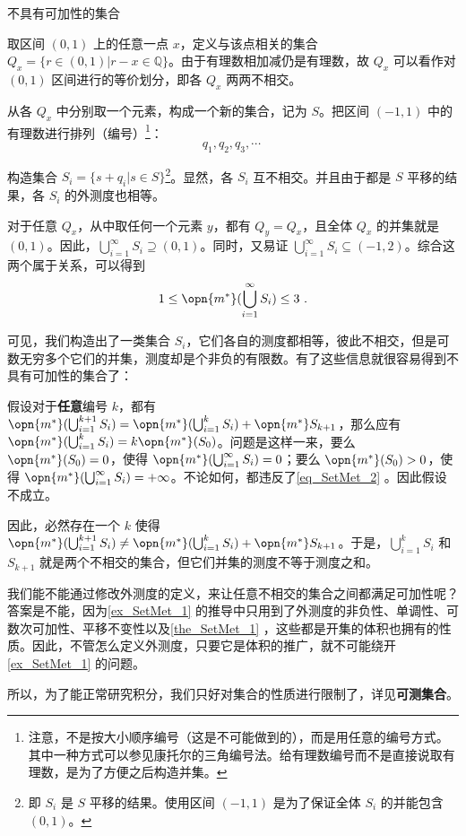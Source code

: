 \begin{example}{不具有可加性的集合}\label{ex_SetMet_1}

取区间 $(0, 1)$ 上的任意一点 $x$，定义与该点相关的集合 $Q_x=\{r\in(0, 1)|r-x\in\mathbb{Q}\}$。由于有理数相加减仍是有理数，故 $Q_x$ 可以看作对 $(0, 1)$ 区间进行的等价划分，即各 $Q_x$ 两两不相交。

从各 $Q_x$ 中分别取一个元素，构成一个新的集合，记为 $S$。把区间 $(-1, 1)$ 中的有理数进行排列（编号）\footnote{注意，不是按大小顺序编号（这是不可能做到的），而是用任意的编号方式。其中一种方式可以参见康托尔的三角编号法。给有理数编号而不是直接说取有理数，是为了方便之后构造并集。}：
\begin{equation}
q_1, q_2, q_3, \cdots ~
\end{equation}

构造集合 $S_i=\{s+q_i|s\in S\}$\footnote{即 $S_i$ 是 $S$ 平移的结果。使用区间 $(-1, 1)$ 是为了保证全体 $S_i$ 的并能包含 $(0, 1)$。}。显然，各 $S_i$ 互不相交。并且由于都是 $S$ 平移的结果，各 $S_i$ 的外测度也相等。

对于任意 $Q_x$，从中取任何一个元素 $y$，都有 $Q_y=Q_x$，且全体 $Q_x$ 的并集就是 $(0, 1)$。因此，$\bigcup_{i=1}^\infty S_i\supseteq (0, 1)$。同时，又易证 $\bigcup_{i=1}^\infty S_i\subseteq (-1, 2)$。综合这两个属于关系，可以得到
\begin{equation}\label{eq_SetMet_2}
1\leq\opn{m^*}(\bigcup_{i=1}^\infty S_i)\leq 3~.
\end{equation}

可见，我们构造出了一类集合 $S_i$，它们各自的测度都相等，彼此不相交，但是可数无穷多个它们的并集，测度却是个非负的有限数。有了这些信息就很容易得到不具有可加性的集合了：

假设对于\textbf{任意}编号 $k$，都有 $\opn{m^*}(\bigcup_{i=1}^{k+1} S_i)=\opn{m^*}(\bigcup_{i=1}^k S_i)+\opn{m^*}S_{k+1}$，那么应有 $\opn{m^*}(\bigcup_{i=1}^{k} S_i)=k\opn{m^*}(S_0)$。问题是这样一来，要么 $\opn{m^*}(S_0)=0$，使得 $\opn{m^*}(\bigcup_{i=1}^\infty S_i)=0$；要么 $\opn{m^*}(S_0)>0$，使得 $\opn{m^*}(\bigcup_{i=1}^\infty S_i)=+\infty$。不论如何，都违反了\autoref{eq_SetMet_2} 。因此假设不成立。

因此，必然存在一个 $k$ 使得 $\opn{m^*}(\bigcup_{i=1}^{k+1} S_i) \neq \opn{m^*}(\bigcup_{i=1}^k S_i)+\opn{m^*}S_{k+1}$。于是，$\bigcup_{i=1}^k S_i$ 和 $S_{k+1}$ 就是两个不相交的集合，但它们并集的测度不等于测度之和。


\end{example}

我们能不能通过修改外测度的定义，来让任意不相交的集合之间都满足可加性呢？答案是不能，因为\autoref{ex_SetMet_1} 的推导中只用到了外测度的非负性、单调性、可数次可加性、平移不变性以及\autoref{the_SetMet_1} ，这些都是开集的体积也拥有的性质。因此，不管怎么定义外测度，只要它是体积的推广，就不可能绕开\autoref{ex_SetMet_1} 的问题。

所以，为了能正常研究积分，我们只好对集合的性质进行限制了，详见\textbf{可测集合}。


















